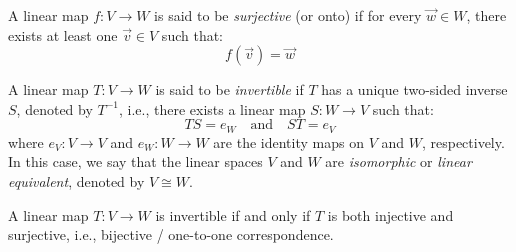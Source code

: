 \documentclass[
	11pt, %
	fleqn, %
	a4paper, %
]{LegrandOrangeBook}
\begin{document}
\begin{definition}
    A linear map $f: V \to W$ is said to be \emph{surjective} (or onto) if for every $\vec{w} \in W$, there exists at least one $\vec{v} \in V$ such that:
    \[
        f(\vec{v}) = \vec{w}
    \]
\end{definition}

\begin{definition}
    A linear map $T: V \to W$ is said to be \emph{invertible} if $T$ has a unique two-sided inverse $S$, denoted by $T^{-1}$, i.e., there exists a linear map $S: W \to V$ such that:
    \[
        TS = e_W \quad \text{and} \quad ST = e_V
    \]
    where $e_V: V \to V$ and $e_W: W \to W$ are the identity maps on $V$ and $W$, respectively.
    In this case, we say that the linear spaces $V$ and $W$ are \emph{isomorphic} or \emph{linear equivalent}, denoted by $V \cong W$.
\end{definition}

\begin{corollary}
    A linear map $T: V \to W$ is invertible if and only if $T$ is both injective and surjective, i.e., bijective / one-to-one correspondence.
\end{corollary}
\end{document}
